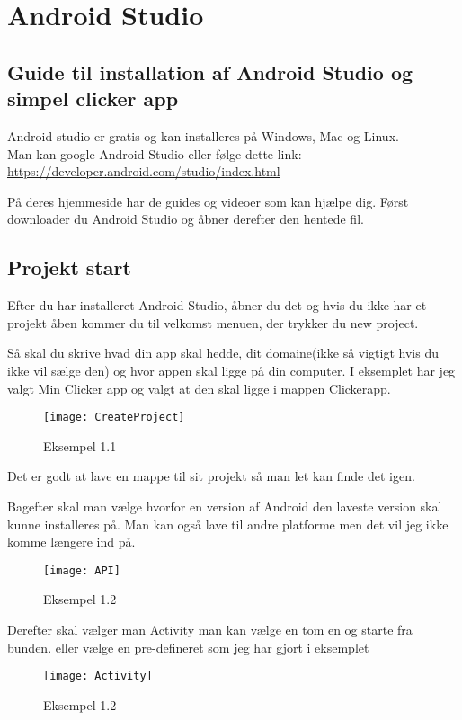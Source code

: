 \chapter{Android Studio}

\section{Guide til installation af Android Studio og simpel clicker app}
Android studio er gratis og kan installeres på Windows, Mac og Linux.\\
Man kan google Android Studio eller følge dette link:\\
\url{https://developer.android.com/studio/index.html}

På deres hjemmeside har de guides og videoer som kan hjælpe dig.
Først downloader du Android Studio og åbner derefter den hentede fil.

\section{Projekt start}
Efter du har installeret Android Studio, åbner du det og hvis du ikke har et projekt åben kommer du til velkomst menuen, der trykker du new project.

Så skal du skrive hvad din app skal hedde, dit domaine(ikke så vigtigt hvis du ikke vil sælge den) og hvor appen skal ligge på din computer. I eksemplet har jeg valgt Min Clicker app og valgt at den skal ligge i mappen Clickerapp. 
\begin{figure}[h]
	\texttt{[image: CreateProject]}
	\caption{Eksempel 1.1}
	\label{fig:createproject}
\end{figure}
Det er godt at lave en mappe til sit projekt så man let kan finde det igen. 

Bagefter skal man vælge hvorfor en version af Android den laveste version skal kunne installeres på. Man kan også lave til andre platforme men det vil jeg ikke komme længere ind på. 
\begin{figure}[h]
	\texttt{[image: API]}
	\caption{Eksempel 1.2}
	\label{fig:API}
\end{figure}

Derefter skal vælger man Activity
man kan vælge en tom en og starte fra bunden. eller vælge en pre-defineret som jeg har gjort i eksemplet

\begin{figure}[h]
	\texttt{[image: Activity]}
	\caption{Eksempel 1.2}
	\label{fig:Activiy}
\end{figure}

